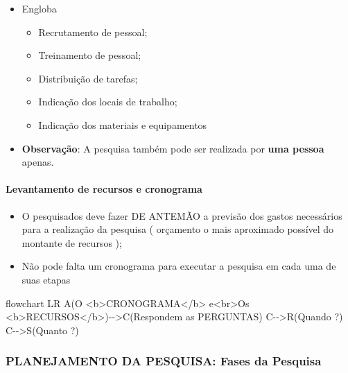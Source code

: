 \documentclass[
]{book}
\newenvironment{Shaded}{\begin{snugshade}}{\end{snugshade}}
\newcommand{\NormalTok}[1]{#1}
\providecommand{\tightlist}{%
  \setlength{\itemsep}{0pt}\setlength{\parskip}{0pt}}
\begin{document}
\begin{itemize}
\tightlist
\item
  Engloba

  \begin{itemize}
  \tightlist
  \item
    Recrutamento de pessoal;
  \item
    Treinamento de pessoal;
  \item
    Distribuição de tarefas;
  \item
    Indicação dos locais de trabalho;
  \item
    Indicação dos materiais e equipamentos
  \end{itemize}
\item
  \textbf{Observação}: A pesquisa também pode ser realizada por \textbf{uma pessoa} apenas.
\end{itemize}

\hypertarget{levantamento-de-recursos-e-cronograma}{%
\paragraph{Levantamento de recursos e cronograma}\label{levantamento-de-recursos-e-cronograma}}

\begin{itemize}
\tightlist
\item
  O pesquisados deve fazer DE ANTEMÃO a previsão dos gastos necessários para a realização da pesquisa ( orçamento o mais aproximado possível do montante de recursos );
\item
  Não pode falta um cronograma para executar a pesquisa em cada uma de suas etapas
\end{itemize}

\begin{Shaded}
\begin{Highlighting}[]
\NormalTok{flowchart LR}
\NormalTok{A(O \textless{}b\textgreater{}CRONOGRAMA\textless{}/b\textgreater{} e\textless{}br\textgreater{}Os \textless{}b\textgreater{}RECURSOS\textless{}/b\textgreater{}){-}{-}\textgreater{}C(Respondem as PERGUNTAS)}
\NormalTok{C{-}{-}\textgreater{}R(Quando ?)}
\NormalTok{C{-}{-}\textgreater{}S(Quanto ?)}
\end{Highlighting}
\end{Shaded}

\hypertarget{planejamento-da-pesquisa-fases-da-pesquisa}{%
\subsubsection{PLANEJAMENTO DA PESQUISA: Fases da Pesquisa}\label{planejamento-da-pesquisa-fases-da-pesquisa}}
\end{document}
